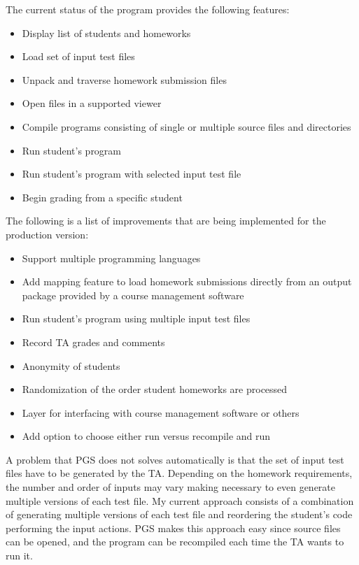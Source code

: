 The current status of the program provides the following features:
\begin{itemize}
    \item Display list of students and homeworks
    \item Load set of input test files
    \item Unpack and traverse homework submission files
    \item Open files in a supported viewer
    \item Compile programs consisting of single or multiple source files and directories
    \item Run student's program
    \item Run student's program with selected input test file
    \item Begin grading from a specific student
\end{itemize}
\vspace{1em}

The following is a list of improvements that are being implemented for
the production version:
\begin{itemize}
    \item Support multiple programming languages
    \item Add mapping feature to load homework submissions directly from an output
          package provided by a course management software
    \item Run student's program using multiple input test files
    \item Record TA grades and comments
    \item Anonymity of students
    \item Randomization of the order student homeworks are processed
    \item Layer for interfacing with course management software or others
    \item Add option to choose either run versus recompile and run
\end{itemize}

\tab A problem that PGS does not solves automatically is that 
the set of input test files have to be generated by the TA.
Depending on the homework requirements, the number and order of inputs
may vary making necessary to even generate multiple versions of each test file.
My current approach consists of a combination of generating multiple versions
of each test file and reordering the student's code performing the input actions.
PGS makes this approach easy since source files can be opened, and
the program can be recompiled each time the TA wants to run it. \par

